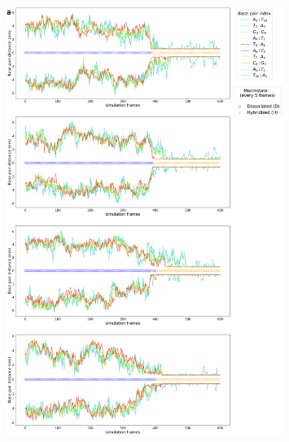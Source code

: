 \documentclass[journal=jpcbfk,manuscript=article]{achemso}
\begin{document}
\clearpage
\newpage

\begin{figure}[ht!]
	\centering
    \includegraphics[width=0.8\textwidth]{FigS5a.pdf}
\end{figure}
\end{document}
